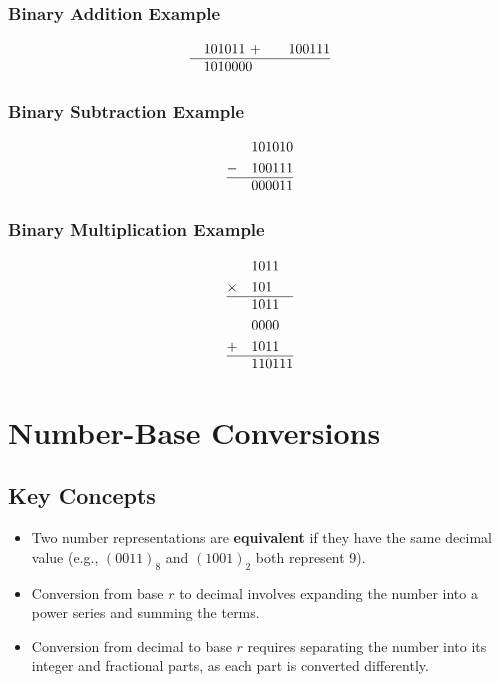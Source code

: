 \documentclass[a4paper,12pt]{article}
\begin{document}
\subsubsection{Binary Addition Example}
\begin{align*}
  &\quad 101011 \
+ &\quad 100111 \\
\hline
  &\quad 1010000
\end{align*}

\subsubsection{Binary Subtraction Example}
\begin{align*}
  &\quad 101010 \\
- &\quad 100111 \\
\hline
  &\quad 000011
\end{align*}

\subsubsection{Binary Multiplication Example}
\begin{align*}
  &\quad 1011 \\
\times &\quad 101 \\
\hline
  &\quad 1011 \\
  &\quad 0000 \\
+ &\quad 1011 \\
\hline
  &\quad 110111
\end{align*}

\newpage

\section{Number-Base Conversions}

\subsection*{Key Concepts}
	\begin{itemize}
		\item Two number representations are \textbf{equivalent} if they have the same decimal value (e.g., $(0011)_8$ and $(1001)_2$ both represent 9).
		\item Conversion from base $r$ to decimal involves expanding the number into a power series and summing the terms.
		\item Conversion from decimal to base $r$ requires separating the number into its integer and fractional parts, as each part is converted differently.
	\end{itemize}
	
\end{document}
